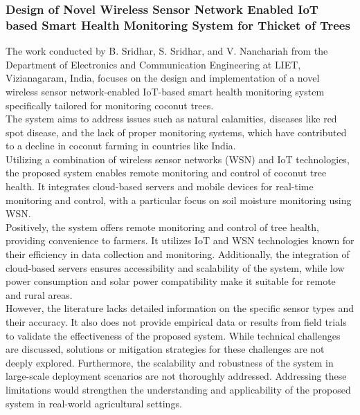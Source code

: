 \documentclass[12pt, a4paper]{article}
\begin{document}
\subsubsection{Design of Novel Wireless Sensor Network Enabled IoT based Smart Health Monitoring System for Thicket of Trees}
The work conducted by B. Sridhar, S. Sridhar, and V. Nanchariah \cite{sridhar2020design} from the Department of Electronics and Communication Engineering at LIET, Vizianagaram, India, focuses on the design and implementation of a novel wireless sensor network-enabled IoT-based smart health monitoring system specifically tailored for monitoring coconut trees.\\
The system aims to address issues such as natural calamities, diseases like red spot disease, and the lack of proper monitoring systems, which have contributed to a decline in coconut farming in countries like India.\\
Utilizing a combination of wireless sensor networks (WSN) and IoT technologies, the proposed system enables remote monitoring and control of coconut tree health. It integrates cloud-based servers and mobile devices for real-time monitoring and control, with a particular focus on soil moisture monitoring using WSN.\\
Positively, the system offers remote monitoring and control of tree health, providing convenience to farmers. It utilizes IoT and WSN technologies known for their efficiency in data collection and monitoring. Additionally, the integration of cloud-based servers ensures accessibility and scalability of the system, while low power consumption and solar power compatibility make it suitable for remote and rural areas.\\
However, the literature lacks detailed information on the specific sensor types and their accuracy. It also does not provide empirical data or results from field trials to validate the effectiveness of the proposed system. While technical challenges are discussed, solutions or mitigation strategies for these challenges are not deeply explored. Furthermore, the scalability and robustness of the system in large-scale deployment scenarios are not thoroughly addressed. Addressing these limitations would strengthen the understanding and applicability of the proposed system in real-world agricultural settings.
\end{document}
